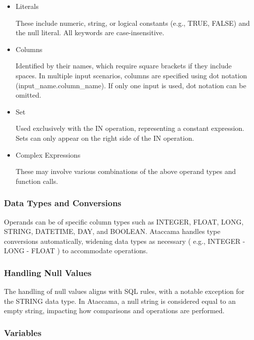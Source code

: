     \begin{itemize}
        \item  Literals
        
        These include numeric, string, or logical constants (e.g., TRUE, FALSE) and the null literal. All keywords are case-insensitive.

        \item Columns
        
        Identified by their names, which require square brackets if they include spaces. In multiple input scenarios, columns are specified using dot notation (input\_name.column\_name). If only one input is used, dot notation can be omitted.

        \item Set
        
        Used exclusively with the IN operation, representing a constant expression. Sets can only appear on the right side of the IN operation.
    
        \item Complex Expressions
        
        These may involve various combinations of the above operand types and function calls.
    \end{itemize}

    \subsubsection{Data Types and Conversions}
    
    Operands can be of specific column types such as INTEGER, FLOAT, LONG, STRING, DATETIME, DAY, and BOOLEAN. Ataccama handles type conversions automatically, widening data types as necessary ( e.g., INTEGER - LONG - FLOAT ) to accommodate operations.

    \subsubsection{Handling Null Values}

    The handling of null values aligns with SQL rules, with a notable exception for the STRING data type. In Ataccama, a null string is considered equal to an empty string, impacting how comparisons and operations are performed.

    \subsubsection{Variables}

